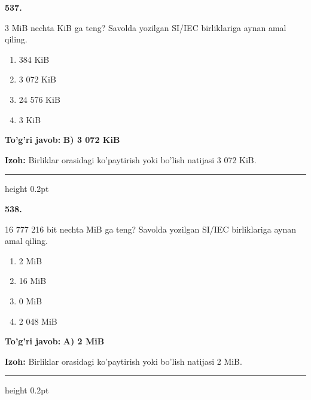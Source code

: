 \documentclass[10pt,a4paper,oneside]{article}
\begin{document}
\noindent\textbf{\color{ink}537.}
\par
3 MiB nechta KiB ga teng? Savolda yozilgan SI/IEC birliklariga aynan amal qiling.
\begin{enumerate}[label=\Alph*),leftmargin=9mm]
\item 384 KiB
\item 3 072 KiB
\item 24 576 KiB
\item 3 KiB
\end{enumerate}
\begin{tcolorbox}[enhanced,breakable,colback=teal!4,colframe=teal!50!black,boxrule=0.5pt,arc=1.1mm,left=3mm,right=3mm,top=1.7mm,bottom=1.7mm,before skip=2mm,after skip=2mm]
\textbf{\color{teal}To'g'ri javob:} \textbf{B) 3 072 KiB}
\par\smallskip
\textbf{Izoh:} Birliklar orasidagi ko'paytirish yoki bo'lish natijasi 3 072 KiB.
\end{tcolorbox}
\vspace{2mm}\hrule height 0.2pt \vspace{3mm}

\noindent\textbf{\color{ink}538.}
\par
16 777 216 bit nechta MiB ga teng? Savolda yozilgan SI/IEC birliklariga aynan amal qiling.
\begin{enumerate}[label=\Alph*),leftmargin=9mm]
\item 2 MiB
\item 16 MiB
\item 0 MiB
\item 2 048 MiB
\end{enumerate}
\begin{tcolorbox}[enhanced,breakable,colback=teal!4,colframe=teal!50!black,boxrule=0.5pt,arc=1.1mm,left=3mm,right=3mm,top=1.7mm,bottom=1.7mm,before skip=2mm,after skip=2mm]
\textbf{\color{teal}To'g'ri javob:} \textbf{A) 2 MiB}
\par\smallskip
\textbf{Izoh:} Birliklar orasidagi ko'paytirish yoki bo'lish natijasi 2 MiB.
\end{tcolorbox}
\vspace{2mm}\hrule height 0.2pt \vspace{3mm}
\end{document}
